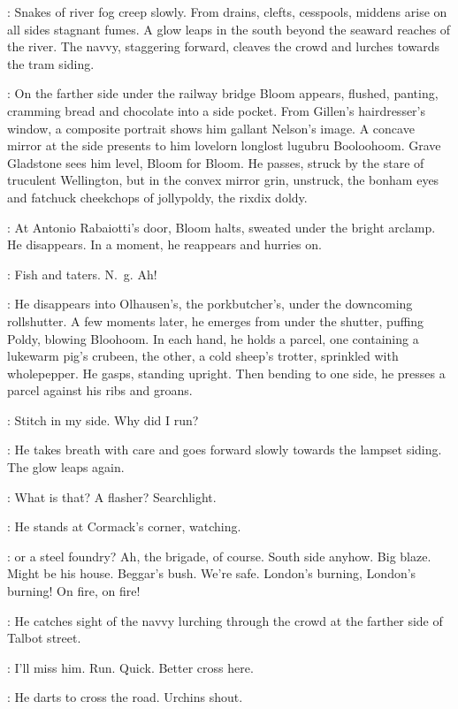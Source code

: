:
Snakes of river fog creep slowly.
From drains, clefts, cesspools, middens
arise on all sides stagnant fumes.
A glow leaps in the south
beyond the seaward reaches of the river.
The navvy, staggering forward, cleaves the crowd
and lurches towards the tram siding.

:
On the farther side under the railway bridge Bloom appears,
flushed, panting, cramming bread and chocolate into a side pocket.
From Gillen's hairdresser's window, a composite portrait
shows him gallant Nelson's image.
A concave mirror at the side presents to him lovelorn longlost lugubru Booloohoom.
Grave Gladstone sees him level, Bloom for Bloom.
He passes, struck by the stare of truculent Wellington,
but in the convex mirror grin, unstruck,
the bonham eyes and fatchuck cheekchops of jollypoldy, the rixdix doldy.

:
At Antonio Rabaiotti's door, Bloom halts,
sweated under the bright arclamp.
He disappears.
In a moment, he reappears and hurries on.

\Bloom:
Fish and taters. N.~g. Ah!

:
He disappears into Olhausen's, the porkbutcher's,
under the downcoming rollshutter.
A few moments later, he emerges from under the shutter,
puffing Poldy, blowing Bloohoom.
In each hand, he holds a parcel,
one containing a lukewarm pig's crubeen,
the other, a cold sheep's trotter, sprinkled with wholepepper.
He gasps, standing upright.
Then bending to one side, he presses a parcel against his ribs and groans.

\Bloom:
Stitch in my side.
Why did I run?

:
He takes breath with care and goes forward slowly towards the lampset siding.
The glow leaps again.

\Bloom:
What is that? A flasher? Searchlight.

:
He stands at Cormack's corner, watching.

\Bloom:
 or a steel foundry?
Ah, the brigade, of course.
South side anyhow.
Big blaze. Might be his house.
Beggar's bush.
We're safe.
London's burning, London's burning! On fire, on fire!

:
He catches sight of the navvy lurching through the crowd
at the farther side of Talbot street.

\Bloom:
I'll miss him.
Run. Quick. Better cross here.

:
He darts to cross the road.
Urchins shout.

